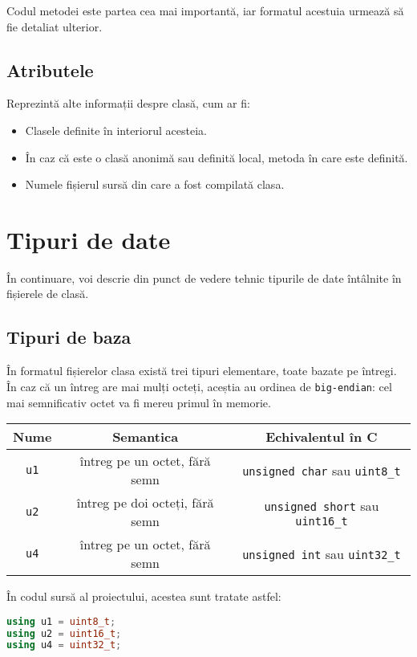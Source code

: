 Codul metodei este partea cea mai importantă, iar formatul acestuia
urmează să fie detaliat ulterior.

\subsection{Atributele}

Reprezintă alte informații despre clasă, cum ar fi:
\begin{itemize}
	\item Clasele definite în interiorul acesteia.
	\item În caz că este o clasă anonimă sau definită local, metoda în care este definită.
	\item Numele fișierul sursă din care a fost compilată clasa.
\end{itemize}

\section{Tipuri de date}

În continuare, voi descrie din punct de vedere tehnic tipurile de date
întâlnite în fișierele de clasă.

\subsection{Tipuri de baza}

În formatul fișierelor clasa există trei tipuri elementare, toate bazate pe
întregi. În caz că un întreg are mai mulți octeți, aceștia au ordinea de
\texttt{big-endian}: cel mai semnificativ octet va fi mereu primul în
memorie.

\begin{longtable}[]{@{}ccc@{}}
	\toprule
	Nume        & Semantica                       & Echivalentul în C\tabularnewline
	\midrule
	\endhead
	\texttt{u1} & întreg pe un octet, fără semn   & \texttt{unsigned\ char}
	sau \texttt{uint8\_t}\tabularnewline
	\texttt{u2} & întreg pe doi octeți, fără semn & \texttt{unsigned\ short}
	sau \texttt{uint16\_t}\tabularnewline
	\texttt{u4} & întreg pe un octet, fără semn   & \texttt{unsigned\ int} sau
	\texttt{uint32\_t}\tabularnewline
	\bottomrule
\end{longtable}

În codul sursă al proiectului, acestea sunt tratate astfel:

\begin{lstlisting}[language=C++]
using u1 = uint8_t;
using u2 = uint16_t;
using u4 = uint32_t;
\end{lstlisting}

